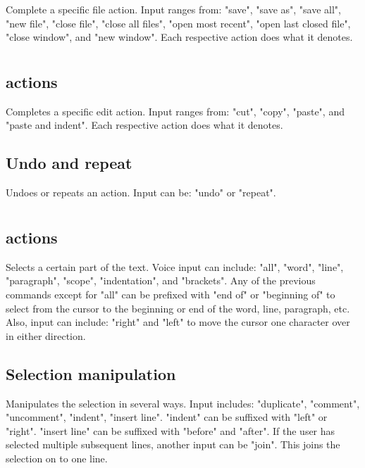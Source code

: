 \documentclass[11pt, oneside]{article}
\begin{document}
Complete a specific file action. Input ranges from: "save", "save as", "save all", "new file", "close file", "close all files", "open most recent", "open last closed file", "close window", and "new window". Each respective action does what it denotes.

\section{}

	\subsection{ actions}
	Completes a specific edit action. Input ranges from: "cut", "copy", "paste", and "paste and indent". Each respective action does what it denotes.

	\subsection{Undo and repeat}
	Undoes or repeats an action. Input can be: "undo" or "repeat".


\section{}

	\subsection{ actions}
	Selects a certain part of the text. Voice input can include: "all", "word", "line", "paragraph", "scope", "indentation", and "brackets". Any of the previous commands except for "all" can be prefixed with "end of" or "beginning of" to select from the cursor to the beginning or end of the word, line, paragraph, etc. Also, input can include: "right" and "left" to move the cursor one character over in either direction.

	\subsection{Selection manipulation}
	Manipulates the selection in several ways. Input includes: "duplicate", "comment", "uncomment", "indent", "insert line". "indent" can be suffixed with "left" or "right". "insert line" can be suffixed with "before" and "after". If the user has selected multiple subsequent lines, another input can be "join". This joins the selection on to one line. 
\end{document}
